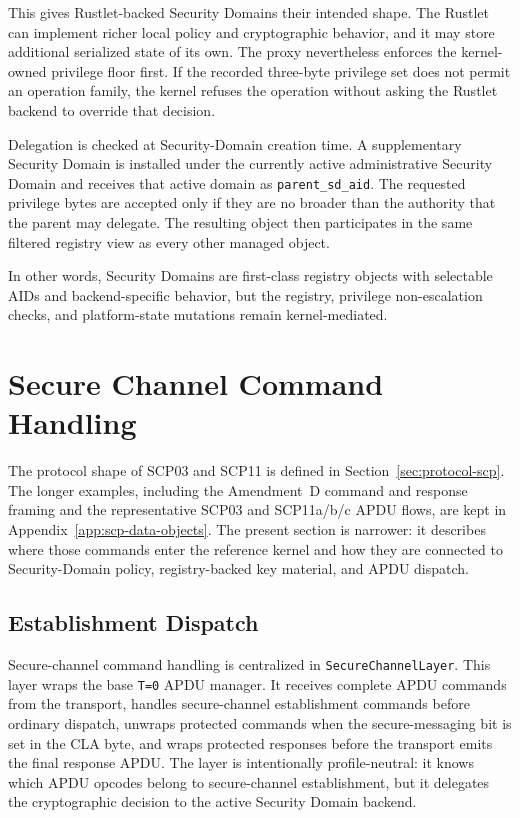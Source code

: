 This gives Rustlet-backed Security Domains their intended shape. The Rustlet
can implement richer local policy and cryptographic behavior, and it may store
additional serialized state of its own. The proxy nevertheless enforces the
kernel-owned privilege floor first. If the recorded three-byte privilege set
does not permit an operation family, the kernel refuses the operation without
asking the Rustlet backend to override that decision.

Delegation is checked at Security-Domain creation time. A supplementary
Security Domain is installed under the currently active administrative
Security Domain and receives that active domain as \texttt{parent\_sd\_aid}.
The requested privilege bytes are accepted only if they are no broader than the
authority that the parent may delegate. The resulting object then participates
in the same filtered registry view as every other managed object.

In other words, Security Domains are first-class registry objects with
selectable AIDs and backend-specific behavior, but the registry, privilege
non-escalation checks, and platform-state mutations remain kernel-mediated.

\section{Secure Channel Command Handling}
\label{sec:impl-scp-commands}

The protocol shape of SCP03 and SCP11 is defined in
Section~\ref{sec:protocol-scp}. The longer examples, including the
Amendment~D command and response framing and the
representative SCP03 and SCP11a/b/c APDU flows, are kept in
Appendix~\ref{app:scp-data-objects}. The present section is narrower: it
describes where those commands enter the reference kernel and how they are
connected to Security-Domain policy, registry-backed key material, and APDU
dispatch.

\subsection{Establishment Dispatch}
\label{sec:impl-scp-establishment-dispatch}

Secure-channel command handling is centralized in
\texttt{SecureChannelLayer}. This layer wraps the base \texttt{T=0} APDU
manager. It receives complete APDU commands from the transport, handles
secure-channel establishment commands before ordinary dispatch, unwraps
protected commands when the secure-messaging bit is set in the CLA byte, and
wraps protected responses before the transport emits the final response APDU.
The layer is intentionally profile-neutral: it knows which APDU opcodes belong
to secure-channel establishment, but it delegates the cryptographic decision to
the active Security Domain backend.

